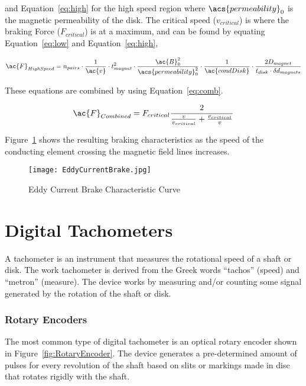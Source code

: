 and Equation~\ref{eq:high} for the high speed region where $\acs{permeability}_0$ is the magnetic permeability of the disk. The critical speed ($v_{critical}$) is  where the braking Force ($F_{critical}$) is at a maximum, and can be found by equating Equation~\ref{eq:low} and Equation~\ref{eq:high},

\begin{equation}
	\ac{F}_{High Speed} = n_{pairs} \cdot \frac{1}{\ac{v}} \cdot t_{magnet}^2 \cdot \frac{\ac{B}_0^2}{\acs{permeability}_0^2} \cdot \frac{1}{\ac{condDisk}} \cdot \frac{2 D_{magnet}}{t_{disk} \cdot \delta d_{magnets}}
	\label{eq:high}
\end{equation}

These equations are combined by using Equation~\ref{eq:comb}. 

\begin{equation}
	\ac{F}_{Combined} = F_{critical} \frac{2}{\frac{v}{v_{critical}} + \frac{v_{critical}}{v}}
	\label{eq:comb}
\end{equation}

Figure~\ref{fig:EddyCurrentBrakeProfile} shows the resulting braking characteristics as the speed of the conducting  element crossing the magnetic field lines increases.

\begin{figure}[H]
	\begin{center}
		\texttt{[image: EddyCurrentBrake.jpg]}
		\caption{Eddy Current Brake Characteristic Curve}
		\label{fig:EddyCurrentBrakeProfile}
	\end{center}
\end{figure}

\section{Digital Tachometers}
A tachometer is an instrument that measures the rotational speed of a shaft or disk. The work tachometer is derived from the Greek words ``tachos'' (speed) and ``metron'' (measure). The device works by measuring and/or counting some signal generated by the rotation of the shaft or disk. \citep{analogic:2018} 

\subsubsection{Rotary Encoders}

The most common type of digital tachometer is an optical rotary encoder shown in Figure~\ref{fig:RotaryEncoder}. The device generates a pre-determined amount of pulses for every revolution of the shaft based on slits or markings made in disc that rotates rigidly with the shaft.

